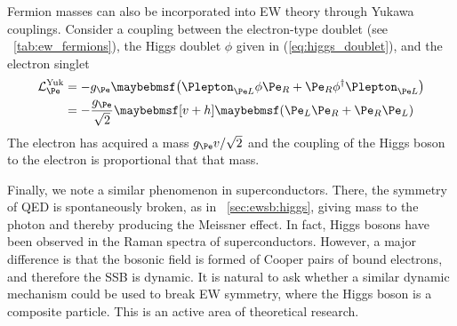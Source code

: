 Fermion masses can also be incorporated into \ac{EW} theory through Yukawa couplings.
Consider a coupling between the electron-type  doublet (see 
\Table~\ref{tab:ew_fermions}), the Higgs doublet $\phi$ given in 
(\ref{eq:higgs_doublet}), and the electron  singlet
\begin{align}
	\mathcal{L}_{\Pe}^{\text{Yuk}} &= -g_{\Pe} \parenths{\Plepton_{\Pe L} \phi \Pe_{R} + \Pe_{R} \phi^{\dagger} \Plepton_{\Pe L}} \\
	&= -\frac{g_{\Pe}}{\sqrt{2}} \sqbracs{v + h} \parenths{\Pe_{L} \Pe_{R} + \Pe_{R} \Pe_{L}}
\end{align}
The electron has acquired a mass $g_{\Pe}v/\sqrt{2}$ and the coupling of the Higgs boson
to the electron is proportional that that mass.

Finally, we note a similar phenomenon in superconductors. There, the  symmetry 
of \ac{QED} is spontaneously broken, as in \Section~\ref{sec:ewsb:higgs}, giving mass to 
the photon and thereby producing the Meissner effect. In fact, Higgs bosons have been 
observed in the Raman spectra of superconductors. However, a major difference is that the 
bosonic field is formed of Cooper pairs of bound electrons, and therefore the \ac{SSB} is 
dynamic. It is natural to ask whether a similar dynamic mechanism could be used to break
\ac{EW} symmetry, where the Higgs boson is a composite particle. This is an active area
of theoretical research.
